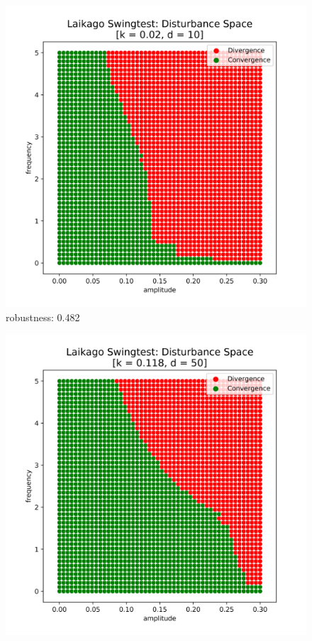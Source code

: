     \begin{figure}[h!]
        \centering
        \begin{minipage}{0.33\textwidth}
            \centering
            \includegraphics[width=\textwidth]{figures/swingtest_ds_bad.png} \\
            \small robustness: 0.482 %
        \end{minipage}\hfill
        \begin{minipage}{0.33\textwidth}
            \centering
            \includegraphics[width=\textwidth]{figures/swingtest_ds_medium.png} \\

\end{minipage}
\end{figure}
